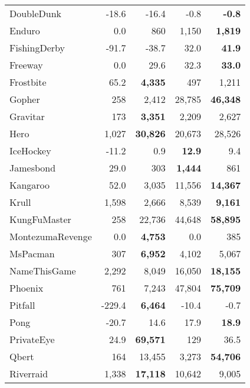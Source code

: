 \documentclass{article}
\begin{document}
\begin{table}[h]
\begin{tabular}{l r r r r}
DoubleDunk           & -18.6      & -16.4      & -0.8       & \textbf{-0.8} \\
Enduro               & 0.0        & 860        & 1,150      & \textbf{1,819} \\
FishingDerby         & -91.7      & -38.7      & 32.0       & \textbf{41.9} \\
Freeway              & 0.0        & 29.6       & 32.3       & \textbf{33.0} \\
Frostbite            & 65.2       & \textbf{4,335} & 497        & 1,211      \\
Gopher               & 258        & 2,412      & 28,785     & \textbf{46,348} \\
Gravitar             & 173        & \textbf{3,351} & 2,209      & 2,627      \\
Hero                 & 1,027      & \textbf{30,826} & 20,673     & 28,526     \\
IceHockey            & -11.2      & 0.9        & \textbf{12.9} & 9.4        \\
Jamesbond            & 29.0       & 303        & \textbf{1,444} & 861        \\
Kangaroo             & 52.0       & 3,035      & 11,556     & \textbf{14,367} \\
Krull                & 1,598      & 2,666      & 8,539      & \textbf{9,161} \\
KungFuMaster         & 258        & 22,736     & 44,648     & \textbf{58,895} \\
MontezumaRevenge     & 0.0        & \textbf{4,753} & 0.0        & 385        \\
MsPacman             & 307        & \textbf{6,952} & 4,102      & 5,067      \\
NameThisGame         & 2,292      & 8,049      & 16,050     & \textbf{18,155} \\
Phoenix              & 761        & 7,243      & 47,804     & \textbf{75,709} \\
Pitfall              & -229.4     & \textbf{6,464} & -10.4      & -0.7       \\
Pong                 & -20.7      & 14.6       & 17.9       & \textbf{18.9} \\
PrivateEye           & 24.9       & \textbf{69,571} & 129        & 36.5       \\
Qbert                & 164        & 13,455     & 3,273      & \textbf{54,706} \\
Riverraid            & 1,338      & \textbf{17,118} & 10,642     & 9,005      \\

\end{tabular}
\end{table}
\end{document}
